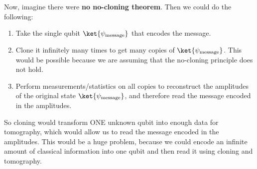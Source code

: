 \highspace
Now, imagine there were \textbf{no no-cloning theorem}. Then we could do the following:
\begin{enumerate}
    \item Take the single qubit $\ket{\psi_{\text{message}}}$ that encodes the message.
    \item Clone it infinitely many times to get many copies of $\ket{\psi_{\text{message}}}$. This would be possible because we are assuming that the no-cloning principle does not hold.
    \item Perform measurements/statistics on all copies to reconstruct the amplitudes of the original state $\ket{\psi_{\text{message}}}$, and therefore read the message encoded in the amplitudes.
\end{enumerate}
So cloning would transform ONE unknown qubit into enough data for tomography, which would allow us to read the message encoded in the amplitudes. This would be a huge problem, because we could encode an infinite amount of classical information into one qubit and then read it using cloning and tomography.

